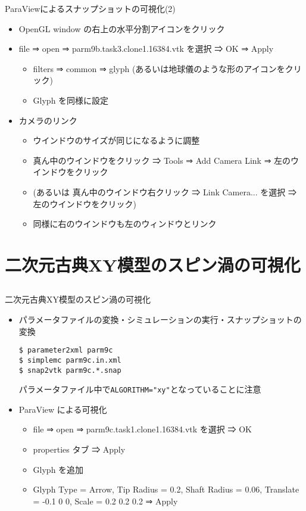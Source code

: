 \begin{frame}[t,fragile]{ParaViewによるスナップショットの可視化(2)}
  \begin{itemize}
  \item OpenGL window の右上の水平分割アイコンをクリック
  \item file ⇒ open ⇒ parm9b.task3.clone1.16384.vtk を選択 ⇒ OK ⇒ Apply
    \begin{itemize}
      \item filters ⇒ common ⇒ glyph (あるいは地球儀のような形のアイコンをクリック)
      \item Glyph を同様に設定
    \end{itemize}
  \item カメラのリンク
    \begin{itemize}
    \item ウインドウのサイズが同じになるように調整
    \item 真ん中のウインドウをクリック ⇒ Tools ⇒ Add Camera Link ⇒ 左のウインドウをクリック
    \item (あるいは 真ん中のウインドウ右クリック ⇒ Link Camera... を選択 ⇒ 左のウインドウをクリック)
    \item 同様に右のウインドウも左のウィンドウとリンク
    \end{itemize}
  \end{itemize}
\end{frame}

\section{二次元古典XY模型のスピン渦の可視化}
\subsection*{\redb\whiteb\greenm}

\begin{frame}[t,fragile]{二次元古典XY模型のスピン渦の可視化}
  \begin{itemize}
  \item パラメータファイルの変換・シミュレーションの実行・スナップショットの変換
\begin{lstlisting}
$ parameter2xml parm9c
$ simplemc parm9c.in.xml
$ snap2vtk parm9c.*.snap
\end{lstlisting}
パラメータファイル中で\verb+ALGORITHM="xy"+となっていることに注意
  \item ParaView による可視化
    \begin{itemize}
      \item file ⇒ open ⇒ parm9c.task1.clone1.16384.vtk を選択 ⇒ OK
      \item properties タブ ⇒ Apply
      \item Glyph を追加
      \item Glyph Type = Arrow, Tip Radius = 0.2, Shaft Radius = 0.06, Translate = -0.1 0 0, Scale = 0.2 0.2 0.2 ⇒ Apply
    \end{itemize}
  \end{itemize}
\end{frame}

